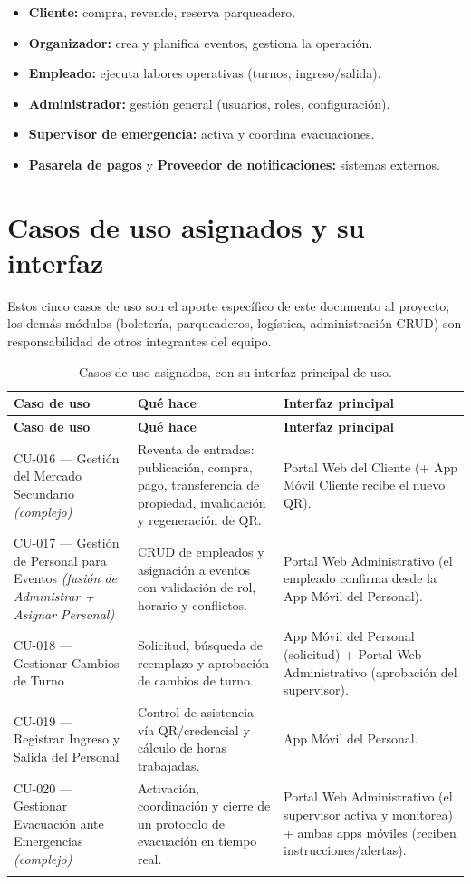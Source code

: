 \documentclass[12pt,a4paper]{article}
\begin{document}
\begin{itemize}
\item \textbf{Cliente:} compra, revende, reserva parqueadero.
\item \textbf{Organizador:} crea y planifica eventos, gestiona la operación.
\item \textbf{Empleado:} ejecuta labores operativas (turnos, ingreso/salida).
\item \textbf{Administrador:} gestión general (usuarios, roles, configuración).
\item \textbf{Supervisor de emergencia:} activa y coordina evacuaciones.
\item \textbf{Pasarela de pagos} y \textbf{Proveedor de notificaciones:} sistemas externos.
\end{itemize}

\section{Casos de uso asignados y su interfaz}

Estos cinco casos de uso son el aporte específico de este documento al proyecto; los demás
módulos (boletería, parqueaderos, logística, administración CRUD) son responsabilidad de otros
integrantes del equipo.

\begin{longtable}{p{3.6cm}p{6.5cm}p{4.2cm}}
\toprule
\textbf{Caso de uso} & \textbf{Qué hace} & \textbf{Interfaz principal}\\
\midrule
\endfirsthead
\toprule
\textbf{Caso de uso} & \textbf{Qué hace} & \textbf{Interfaz principal}\\
\midrule
\endhead
CU-016 --- Gestión del Mercado Secundario \textit{(complejo)} &
Reventa de entradas: publicación, compra, pago, transferencia de propiedad, invalidación y
regeneración de QR. &
Portal Web del Cliente (+ App Móvil Cliente recibe el nuevo QR).\\[0.5em]
CU-017 --- Gestión de Personal para Eventos \textit{(fusión de Administrar + Asignar Personal)} &
CRUD de empleados y asignación a eventos con validación de rol, horario y conflictos. &
Portal Web Administrativo (el empleado confirma desde la App Móvil del Personal).\\[0.5em]
CU-018 --- Gestionar Cambios de Turno &
Solicitud, búsqueda de reemplazo y aprobación de cambios de turno. &
App Móvil del Personal (solicitud) + Portal Web Administrativo (aprobación del supervisor).\\[0.5em]
CU-019 --- Registrar Ingreso y Salida del Personal &
Control de asistencia vía QR/credencial y cálculo de horas trabajadas. &
App Móvil del Personal.\\[0.5em]
CU-020 --- Gestionar Evacuación ante Emergencias \textit{(complejo)} &
Activación, coordinación y cierre de un protocolo de evacuación en tiempo real. &
Portal Web Administrativo (el supervisor activa y monitorea) + ambas apps móviles (reciben
instrucciones/alertas).\\
\bottomrule
\caption{Casos de uso asignados, con su interfaz principal de uso.}
\end{longtable}
\end{document}
